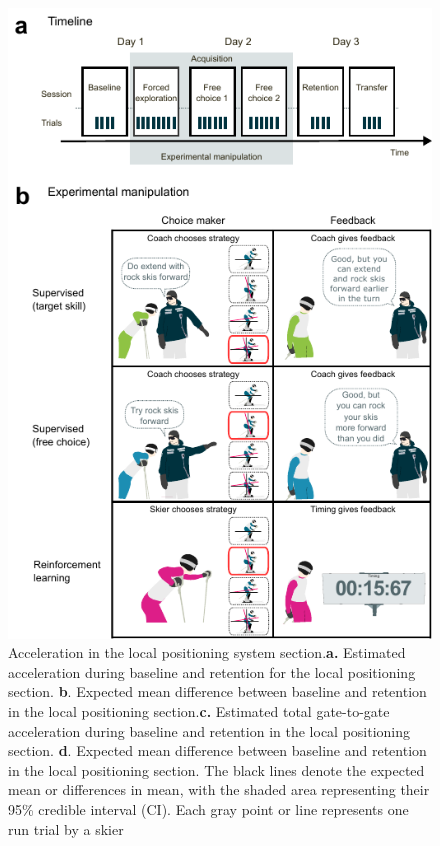 \begin{figure}[H]
\centering
\includegraphics{figure_method_experiment.pdf}
\caption{Acceleration in the local positioning system section.\textbf{a.} Estimated acceleration during baseline and retention for the local positioning section. \textbf{b}. Expected mean difference between baseline and retention in the local positioning section.\textbf{c.} Estimated total gate-to-gate acceleration during baseline and retention in the local positioning section. \textbf{d}. Expected mean difference between baseline and retention in the local positioning section. The black lines denote the expected mean or differences in mean, with the shaded area representing their 95\% credible interval (CI). Each gray point or line represents one run trial by a skier}\label{fig: acc}
\end{figure}


